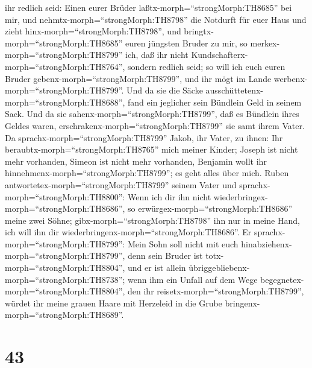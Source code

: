 ihr redlich seid: Einen eurer Brüder laßtx-morph=``strongMorph:TH8685''
bei mir, und nehmtx-morph=``strongMorph:TH8798'' die Notdurft für euer
Haus und zieht hinx-morph=``strongMorph:TH8798'',  und
bringtx-morph=``strongMorph:TH8685'' euren jüngsten Bruder zu mir, so
merkex-morph=``strongMorph:TH8799'' ich, daß ihr nicht
Kundschafterx-morph=``strongMorph:TH8764'', sondern redlich seid; so
will ich euch euren Bruder gebenx-morph=``strongMorph:TH8799'', und ihr
mögt im Lande werbenx-morph=``strongMorph:TH8799''.  Und da
sie die Säcke ausschüttetenx-morph=``strongMorph:TH8688'', fand ein
jeglicher sein Bündlein Geld in seinem Sack. Und da sie
sahenx-morph=``strongMorph:TH8799'', daß es Bündlein ihres Geldes waren,
erschrakenx-morph=``strongMorph:TH8799'' sie samt ihrem Vater.
 Da sprachx-morph=``strongMorph:TH8799'' Jakob, ihr Vater,
zu ihnen: Ihr beraubtx-morph=``strongMorph:TH8765'' mich meiner Kinder;
Joseph ist nicht mehr vorhanden, Simeon ist nicht mehr vorhanden,
Benjamin wollt ihr hinnehmenx-morph=``strongMorph:TH8799''; es geht
alles über mich.  Ruben
antwortetex-morph=``strongMorph:TH8799'' seinem Vater und
sprachx-morph=``strongMorph:TH8800'': Wenn ich dir ihn nicht
wiederbringex-morph=``strongMorph:TH8686'', so
erwürgex-morph=``strongMorph:TH8686'' meine zwei Söhne;
gibx-morph=``strongMorph:TH8798'' ihn nur in meine Hand, ich will ihn
dir wiederbringenx-morph=``strongMorph:TH8686''.  Er
sprachx-morph=``strongMorph:TH8799'': Mein Sohn soll nicht mit euch
hinabziehenx-morph=``strongMorph:TH8799'', denn sein Bruder ist
totx-morph=``strongMorph:TH8804'', und er ist allein
übriggebliebenx-morph=``strongMorph:TH8738''; wenn ihm ein Unfall auf
dem Wege begegnetex-morph=``strongMorph:TH8804'', den ihr
reisetx-morph=``strongMorph:TH8799'', würdet ihr meine grauen Haare mit
Herzeleid in die Grube bringenx-morph=``strongMorph:TH8689''.

\hypertarget{section-42}{%
\section{43}\label{section-42}}

